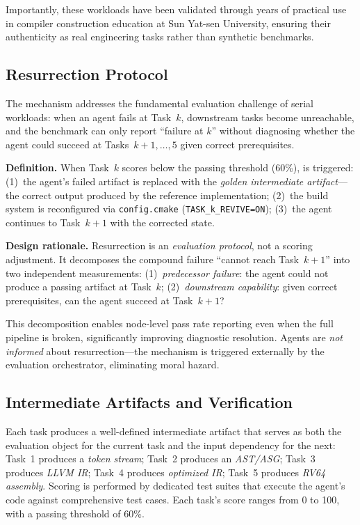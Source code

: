 Importantly, these workloads have been validated through years of practical use in compiler construction education at Sun Yat-sen University, ensuring their authenticity as real engineering tasks rather than synthetic benchmarks.

\subsection{Resurrection Protocol}

The \resurrection{} mechanism addresses the fundamental evaluation challenge of serial workloads: when an agent fails at Task~$k$, downstream tasks become unreachable, and the benchmark can only report ``failure at $k$'' without diagnosing whether the agent could succeed at Tasks~$k+1, \ldots, 5$ given correct prerequisites.

\textbf{Definition.}
When Task~$k$ scores below the passing threshold (60\%), \resurrection{} is triggered:
(1)~the agent's failed artifact is replaced with the \emph{golden intermediate artifact}---the correct output produced by the reference implementation;
(2)~the build system is reconfigured via \texttt{config.cmake} (\texttt{TASK\_k\_REVIVE=ON});
(3)~the agent continues to Task~$k+1$ with the corrected state.

\textbf{Design rationale.}
Resurrection is an \emph{evaluation protocol}, not a scoring adjustment.
It decomposes the compound failure ``cannot reach Task~$k+1$'' into two independent measurements:
(1)~\emph{predecessor failure}: the agent could not produce a passing artifact at Task~$k$;
(2)~\emph{downstream capability}: given correct prerequisites, can the agent succeed at Task~$k+1$?

This decomposition enables node-level pass rate reporting even when the full pipeline is broken, significantly improving diagnostic resolution.
Agents are \emph{not informed} about resurrection---the mechanism is triggered externally by the evaluation orchestrator, eliminating moral hazard.

\subsection{Intermediate Artifacts and Verification}

Each task produces a well-defined intermediate artifact that serves as both the evaluation object for the current task and the input dependency for the next:
Task~1 produces a \emph{token stream}; Task~2 produces an \emph{AST/ASG}; Task~3 produces \emph{LLVM IR}; Task~4 produces \emph{optimized IR}; Task~5 produces \emph{RV64 assembly}.
Scoring is performed by dedicated test suites that execute the agent's code against comprehensive test cases.
Each task's score ranges from 0 to 100, with a passing threshold of 60\%.